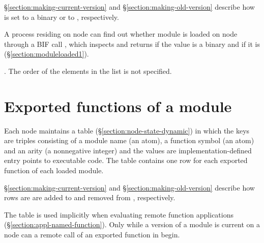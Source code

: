 \S\ref{section:making-current-version} and \S\ref{section:making-old-version}
describe how  is set to a binary or
to , respectively.

A process residing on node  can find out whether module  is loaded on
node  through a BIF call
\ifOld {}\fi
\ifStd {}\fi,
which inspects  and
returns  if the value is a binary
and  if it is  (\S\ref{section:moduleloaded1}).

\iffalse
\index{module!preloaded on a node|(}
A process residing on node \TZ{N} can obtain a list of the module names in
\T{preloaded[\Z{N}]}, i.e., the names of the modules
that were loaded as part
of starting the node \TZ{N}, through a BIF call
\ifOld \T{erlang:pre_loaded()}\fi
\ifStd {}\fi.
The order of the elements in the list is not specified.
\fi
{}

\section{Exported functions of a module}

\label{section:exported-functions}

Each node maintains a table  (\S\ref{section:node-state-dynamic})
in which the keys are triples consisting of a module name (an atom), a function
symbol (an atom) and an arity (a nonnegative integer) and the values are
\ifStd implementation-defined \fi
entry points to executable code.  The table contains one row for
each exported function of each loaded module.

\S\ref{section:making-current-version} and \S\ref{section:making-old-version}
describe how rows are are added to and removed from
, respectively.

The table  is used implicitly
when evaluating remote function applications (\S\ref{section:appl-named-function}).
Only while a version  of a module  is current on a node  can
a remote call of an exported function  in  begin.

